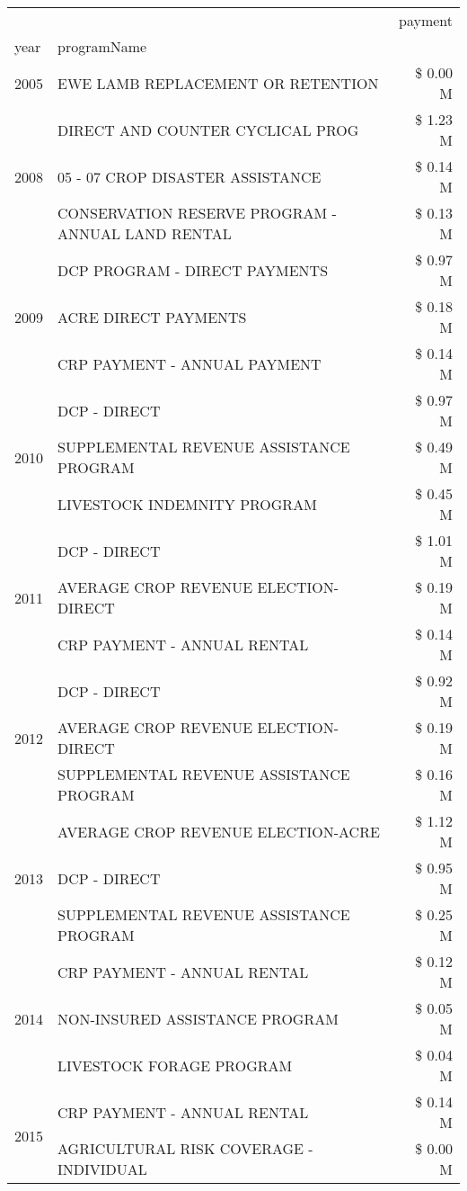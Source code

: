 \begin{tabular}{llr}
\toprule
 &  & payment \\
year & programName &  \\
\midrule
2005 & EWE LAMB REPLACEMENT OR RETENTION & \$ 0.00 M \\
\cline{1-3}
\multirow[t]{3}{*}{2008} & DIRECT AND COUNTER CYCLICAL PROG & \$ 1.23 M \\
 & 05 - 07 CROP DISASTER ASSISTANCE & \$ 0.14 M \\
 & CONSERVATION RESERVE PROGRAM - ANNUAL LAND RENTAL & \$ 0.13 M \\
\cline{1-3}
\multirow[t]{3}{*}{2009} & DCP PROGRAM - DIRECT PAYMENTS & \$ 0.97 M \\
 & ACRE DIRECT PAYMENTS & \$ 0.18 M \\
 & CRP PAYMENT - ANNUAL PAYMENT & \$ 0.14 M \\
\cline{1-3}
\multirow[t]{3}{*}{2010} & DCP - DIRECT & \$ 0.97 M \\
 & SUPPLEMENTAL REVENUE ASSISTANCE PROGRAM & \$ 0.49 M \\
 & LIVESTOCK INDEMNITY PROGRAM & \$ 0.45 M \\
\cline{1-3}
\multirow[t]{3}{*}{2011} & DCP - DIRECT & \$ 1.01 M \\
 & AVERAGE CROP REVENUE ELECTION-DIRECT & \$ 0.19 M \\
 & CRP PAYMENT - ANNUAL RENTAL & \$ 0.14 M \\
\cline{1-3}
\multirow[t]{3}{*}{2012} & DCP - DIRECT & \$ 0.92 M \\
 & AVERAGE CROP REVENUE ELECTION-DIRECT & \$ 0.19 M \\
 & SUPPLEMENTAL REVENUE ASSISTANCE PROGRAM & \$ 0.16 M \\
\cline{1-3}
\multirow[t]{3}{*}{2013} & AVERAGE CROP REVENUE ELECTION-ACRE & \$ 1.12 M \\
 & DCP - DIRECT & \$ 0.95 M \\
 & SUPPLEMENTAL REVENUE ASSISTANCE PROGRAM & \$ 0.25 M \\
\cline{1-3}
\multirow[t]{3}{*}{2014} & CRP PAYMENT - ANNUAL RENTAL & \$ 0.12 M \\
 & NON-INSURED ASSISTANCE PROGRAM & \$ 0.05 M \\
 & LIVESTOCK FORAGE PROGRAM & \$ 0.04 M \\
\cline{1-3}
\multirow[t]{3}{*}{2015} & CRP PAYMENT - ANNUAL RENTAL & \$ 0.14 M \\
 & AGRICULTURAL RISK COVERAGE - INDIVIDUAL & \$ 0.00 M \\

\end{tabular}
